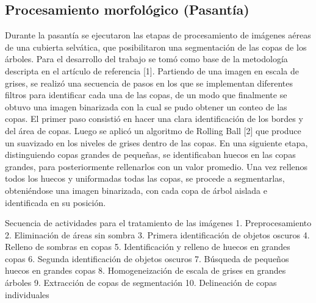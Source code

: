 \subsection{Procesamiento morfológico (Pasantía)}
Durante la pasantía se ejecutaron las etapas de procesamiento de imágenes aéreas de
una cubierta selvática, que posibilitaron una segmentación de las copas de los árboles. 
Para el desarrollo del trabajo se tomó como base de la metodología descripta en el
artículo de referencia [1]. Partiendo de una imagen en escala de grises, se realizó una
secuencia de pasos en los que se implementan diferentes filtros para identificar cada una
de las copas, de un modo que finalmente se obtuvo una imagen binarizada con la cual se
pudo obtener un conteo de las copas. El primer paso consistió en hacer una clara identificación de los bordes y del área de
copas. Luego se aplicó un algoritmo de Rolling Ball [2] que produce un suavizado en
los niveles de grises dentro de las copas. En una siguiente etapa, distinguiendo copas
grandes de pequeñas, se identificaban huecos en las copas grandes, para posteriormente
rellenarlos con un valor promedio. Una vez rellenos todos los huecos y uniformadas
todas las copas, se procede a segmentarlas, obteniéndose una imagen binarizada, con
cada copa de árbol aislada e identificada en su posición.

Secuencia de actividades para el tratamiento de las imágenes
1. Preprocesamiento
2. Eliminación de áreas sin sombra
3. Primera identificación de objetos oscuros
4. Relleno de sombras en copas
5. Identificación y relleno de huecos en grandes copas
6. Segunda identificación de objetos oscuros
7. Búsqueda de pequeños huecos en grandes copas
8. Homogeneización de escala de grises en grandes árboles
9. Extracción de copas de segmentación
10.  Delineación de copas individuales

